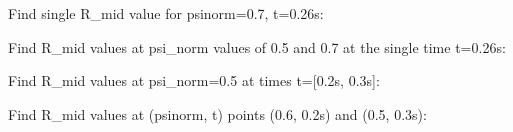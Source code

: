 \documentclass[letterpaper,10pt,english]{sphinxmanual}
\begin{document}
\begin{fulllineitems}
\begin{fulllineitems}
Find single R\_mid value for psinorm=0.7, t=0.26s:

\begin{sphinxVerbatim}[commandchars=\\\{\}]
   
\end{sphinxVerbatim}

Find R\_mid values at psi\_norm values of 0.5 and 0.7 at the single time
t=0.26s:

\begin{sphinxVerbatim}[commandchars=\\\{\}]
  \PYG{p}{[} \PYG{p}{]} 
\end{sphinxVerbatim}

Find R\_mid values at psi\_norm=0.5 at times t={[}0.2s, 0.3s{]}:

\begin{sphinxVerbatim}[commandchars=\\\{\}]
   \PYG{p}{[} \PYG{p}{]}
\end{sphinxVerbatim}

Find R\_mid values at (psinorm, t) points (0.6, 0.2s) and (0.5, 0.3s):

\begin{sphinxVerbatim}[commandchars=\\\{\}]
  \PYG{p}{[} \PYG{p}{]} \PYG{p}{[} \PYG{p}{]} 
\end{sphinxVerbatim}

\end{fulllineitems}



\end{fulllineitems}
\end{document}
